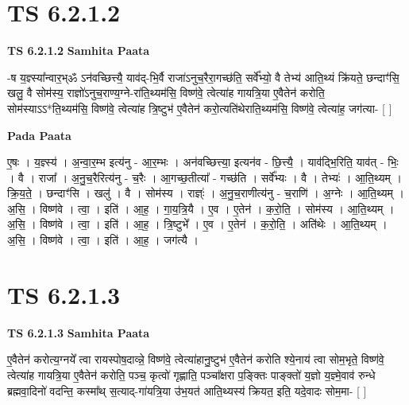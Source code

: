 \documentclass[17pt]{extarticle}
\begin{document}

\section{ TS 6.2.1.2 }

\textbf{TS 6.2.1.2 } \newline
\textbf{Samhita Paata} \newline

-ष य॒ज्ञ्स्या᳚न्वार॒भ्ॐ ऽन॑वच्छित्त्यै॒ याव॑द्-भि॒र्वै राजा॑ऽनुच॒रैरा॒गच्छ॑ति॒ सर्वे᳚भ्यो॒ वै तेभ्य॑ आति॒थ्यं क्रि॑यते॒ छन्दाꣳ॑सि॒ खलु॒ वै सोम॑स्य॒ राज्ञो॑ऽनुच॒राण्य॒ग्ने-रा॑ति॒थ्यम॑सि॒ विष्ण॑वे॒ त्वेत्या॑ह गायत्रि॒या ए॒वैतेन॑ करोति॒ सोम॑स्याऽऽ*ति॒थ्यम॑सि॒ विष्ण॑वे॒ त्वेत्या॑ह त्रि॒ष्टुभ॑ ए॒वैतेन॑ करो॒त्यति॑थेराति॒थ्यम॑सि॒ विष्ण॑वे॒ त्वेत्या॑ह॒ जग॑त्या- [  ] \newline

\textbf{Pada Paata} \newline

ए॒षः । य॒ज्ञ्स्य॑ । अ॒न्वा॒र॒म्भ इत्य॑नु -  आ॒र॒म्भः । अन॑वच्छित्त्या॒ इत्यन॑व - छि॒त्त्यै॒ । याव॑द्भि॒रिति॒ याव॑त् - भिः॒ । वै । राजा᳚ । अ॒नु॒च॒रैरित्य॑नु - च॒रैः । आ॒गच्छ॒तीत्या᳚ - गच्छ॑ति । सर्वे᳚भ्यः । वै । तेभ्यः॑ । आ॒ति॒थ्यम् । क्रि॒य॒ते॒ । छन्दाꣳ॑सि । खलु॑ । वै । सोम॑स्य । राज्ञ्ः॑ । अ॒नु॒च॒राणीत्य॑नु - च॒राणि॑ । अ॒ग्नेः । आ॒ति॒थ्यम् । अ॒सि॒ । विष्ण॑वे । त्वा॒ । इति॑ । आ॒ह॒ । गा॒य॒त्रि॒यै । ए॒व । ए॒तेन॑ । क॒रो॒ति॒ । सोम॑स्य । आ॒ति॒थ्यम् । अ॒सि॒ । विष्ण॑वे । त्वा॒ । इति॑ । आ॒ह॒ । त्रि॒ष्टुभे᳚ । ए॒व । ए॒तेन॑ । क॒रो॒ति॒ । अति॑थेः । आ॒ति॒थ्यम् । अ॒सि॒ । विष्ण॑वे । त्वा॒ । इति॑ । आ॒ह॒ । जग॑त्यै ।  \newline





\section{ TS 6.2.1.3 }

\textbf{TS 6.2.1.3 } \newline
\textbf{Samhita Paata} \newline

ए॒वैतेन॑ करोत्य॒ग्नये᳚ त्वा रायस्पोष॒दाव्न्ने॒ विष्ण॑वे॒ त्वेत्या॑हानु॒ष्टुभ॑ ए॒वैतेन॑ करोति श्ये॒नाय॑ त्वा सोम॒भृते॒ विष्ण॑वे॒ त्वेत्या॑ह गायत्रि॒या ए॒वैतेन॑ करोति॒ पञ्च॒ कृत्वो॑ गृह्णाति॒ पञ्चा᳚क्षरा प॒ङ्क्तिः पाङ्क्तो॑ य॒ज्ञो य॒ज्ञ्मे॒वाव॑ रुन्धे ब्रह्मवा॒दिनो॑ वदन्ति॒ कस्मा᳚थ् स॒त्याद्-गा॑यत्रि॒या उ॑भ॒यत॑ आति॒थ्यस्य॑ क्रियत॒ इति॒ यदे॒वादः सोम॒मा- [  ] \newline
\end{document}

